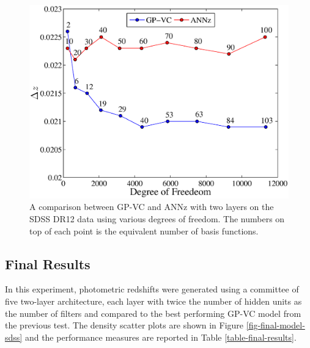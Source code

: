 \documentclass[useAMS,usenatbib,fleqn]{mn2e}
\begin{document}
\begin{figure}
	\centering
	\includegraphics[width=\columnwidth]{figures/sdss_final.eps}
	\caption{A comparison between GP-VC and {\sc ANNz} with two layers on the SDSS DR12 data using various degrees of freedom. The numbers on top of each point is the equivalent number of basis functions.}
	\label{fig-ann-gpvc-sdss}
\end{figure}

\subsection{Final Results}

In this experiment, photometric redshifts were generated using a committee of five two-layer architecture, each layer with twice the number of hidden units as the number of filters and compared to the best performing GP-VC model from the previous test. The density scatter plots are shown in Figure \ref{fig-final-model-sdss} and the performance measures are reported in Table \ref{table-final-results}.
\end{document}
